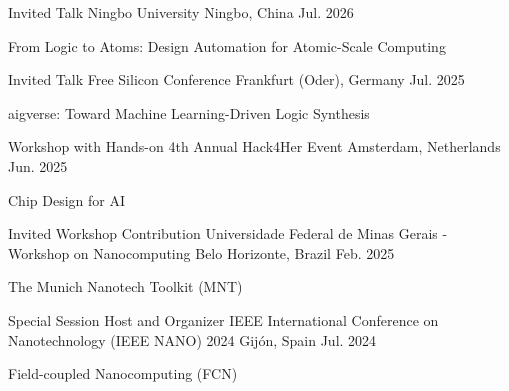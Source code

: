 

\begin{cventries}

  \cventry
    {Invited Talk} %
    {Ningbo University} %
    {Ningbo, China} %
    {Jul. 2026} %
    {
      \begin{cvitems} %
        \item {From Logic to Atoms: Design Automation for Atomic-Scale Computing}
      \end{cvitems}
    }

  \cventry
    {Invited Talk} %
    {Free Silicon Conference} %
    {Frankfurt (Oder), Germany} %
    {Jul. 2025} %
    {
      \begin{cvitems} %
        \item {aigverse: Toward Machine Learning-Driven Logic Synthesis}
      \end{cvitems}
    }

  \cventry
    {Workshop with Hands-on} %
    {4th Annual Hack4Her Event} %
    {Amsterdam, Netherlands} %
    {Jun. 2025} %
    {
      \begin{cvitems} %
        \item {Chip Design for AI}
      \end{cvitems}
    }

  \cventry
    {Invited Workshop Contribution} %
    {Universidade Federal de Minas Gerais - Workshop on Nanocomputing} %
    {Belo Horizonte, Brazil} %
    {Feb. 2025} %
    {
      \begin{cvitems} %
        \item {The Munich Nanotech Toolkit (MNT)}
      \end{cvitems}
    }

  \cventry
    {Special Session Host and Organizer} %
    {IEEE International Conference on Nanotechnology (IEEE NANO) 2024} %
    {Gijón, Spain} %
    {Jul. 2024} %
    {
      \begin{cvitems} %
        \item {Field-coupled Nanocomputing (FCN)}
      \end{cvitems}
    }


\end{cventries}
